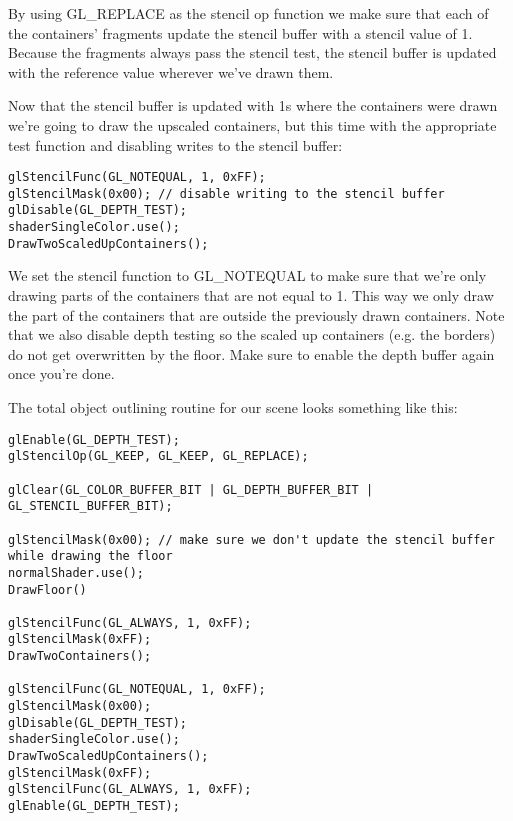 \documentclass{article}
\begin{document}
By using GL\_REPLACE as the stencil op function we make sure that each of the containers' fragments update the stencil buffer with a stencil value of 1. Because the fragments always pass the stencil test, the stencil buffer is updated with the reference value wherever we've drawn them.

Now that the stencil buffer is updated with 1s where the containers were drawn we're going to draw the upscaled containers, but this time with the appropriate test function and disabling writes to the stencil buffer:


\begin{lstlisting}
glStencilFunc(GL_NOTEQUAL, 1, 0xFF);
glStencilMask(0x00); // disable writing to the stencil buffer
glDisable(GL_DEPTH_TEST);
shaderSingleColor.use(); 
DrawTwoScaledUpContainers();
\end{lstlisting}

We set the stencil function to GL\_NOTEQUAL to make sure that we're only drawing parts of the containers that are not equal to 1. This way we only draw the part of the containers that are outside the previously drawn containers. Note that we also disable depth testing so the scaled up containers (e.g. the borders) do not get overwritten by the floor. Make sure to enable the depth buffer again once you're done.

The total object outlining routine for our scene looks something like this:


\begin{lstlisting}
glEnable(GL_DEPTH_TEST);
glStencilOp(GL_KEEP, GL_KEEP, GL_REPLACE);  
  
glClear(GL_COLOR_BUFFER_BIT | GL_DEPTH_BUFFER_BIT | GL_STENCIL_BUFFER_BIT); 

glStencilMask(0x00); // make sure we don't update the stencil buffer while drawing the floor
normalShader.use();
DrawFloor()  
  
glStencilFunc(GL_ALWAYS, 1, 0xFF); 
glStencilMask(0xFF); 
DrawTwoContainers();
  
glStencilFunc(GL_NOTEQUAL, 1, 0xFF);
glStencilMask(0x00); 
glDisable(GL_DEPTH_TEST);
shaderSingleColor.use(); 
DrawTwoScaledUpContainers();
glStencilMask(0xFF);
glStencilFunc(GL_ALWAYS, 1, 0xFF);   
glEnable(GL_DEPTH_TEST);
\end{lstlisting}  
\end{document}
